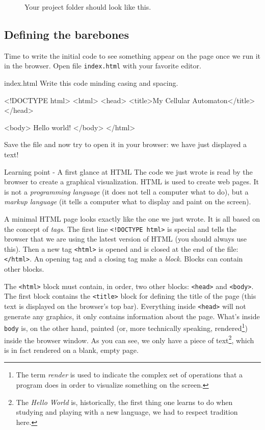%
\begin{figure}[b]
\sidecaption

%
%
\caption{Your project folder should look like this.}
\label{fig:dirstruct1}
\end{figure}
%

\subsection{Defining the barebones}
Time to write the initial code to see something appear on the page once we run it in the browser.
Open file \texttt{index.html} with your favorite editor.

\begin{programcode}{index.html}
Write this code minding casing and spacing.
\begin{codehtml}
<!DOCTYPE html>
<html>
<head>
  <title>My Cellular Automaton</title>
</head>

<body>
  Hello world!
</body>
</html>
\end{codehtml}
\end{programcode}

Save the file and now try to open it in your browser: we have just displayed a text!

\begin{tips}{Learning point - A first glance at HTML}
The code we just wrote is read by the browser to create a graphical visualization. HTML is used to
create web pages. It is not a \textit{programming language} (it does not tell a computer what to do),
but a \textit{markup language} (it tells a computer what to display and paint on the screen).

A minimal HTML page looks exactly like the one we just wrote.
It is all based on the concept of \textit{tags}. The
first line \texttt{<!DOCTYPE html>} is special and tells the browser that we are using the latest
version of HTML (you should always use this). Then a new tag \texttt{<html>} is opened and is
closed at the end of the file: \texttt{</html>}. An opening tag and a closing tag make a \textit{block}.
Blocks can contain other blocks.

The \texttt{<html>} block must contain, in order, two other blocks:
\texttt{<head>} and \texttt{<body>}. The first block contains the \texttt{<title>}
block for defining the title of the page
(this text is displayed on the browser's top bar). Everything inside \texttt{<head>} will not generate any 
graphics, it only contains information about the page. What's inside \texttt{body} is, on the other hand, 
painted (or, more technically speaking, rendered\footnote{The term \textit{render} is used to indicate
the complex set of operations that a program does in order to visualize something on the screen.})
inside the browser window. As you can see, we only have a piece of 
text\footnote{The \textit{Hello World} is, historically, the first thing one learns
to do when studying and playing with a new language, we had to respect tradition here.}, which
is in fact rendered on a blank, empty page.
\end{tips}

